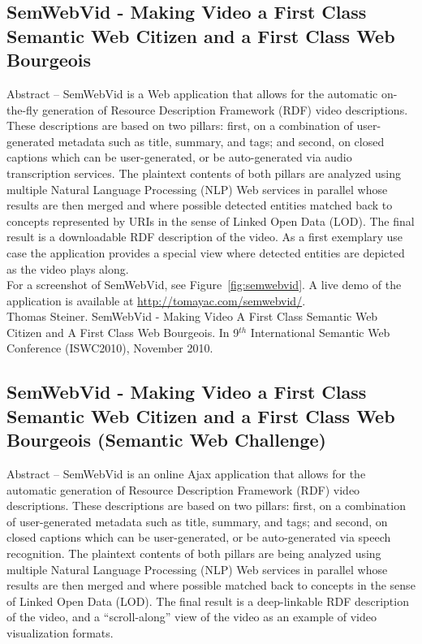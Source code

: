 \documentclass[12pt]{article}
\begin{document}
\subsection{SemWebVid - Making Video a First Class Semantic Web Citizen and a First Class Web Bourgeois}
Abstract -- SemWebVid is a Web application that allows for the automatic on-the-fly generation of Resource Description Framework (RDF) video descriptions. These descriptions are based on two pillars: first, on a combination of user-generated metadata such as title, summary, and tags; and second, on closed captions which can be user-generated, or be auto-generated via audio transcription services. The plaintext contents of both pillars are analyzed using multiple Natural Language Processing (NLP) Web services in parallel whose results are then merged and where possible detected entities matched back to concepts represented by URIs in the sense of Linked Open Data (LOD). The final result is a downloadable RDF description of the video. As a first exemplary use case the application provides a special view where detected entities are depicted as the video plays along.\\

\noindent For a screenshot of SemWebVid, see Figure~\ref{fig:semwebvid}. A live demo of the application is available at \url{http://tomayac.com/semwebvid/}.\\

\noindent Thomas Steiner. SemWebVid - Making Video A First Class Semantic Web Citizen and A First Class Web Bourgeois. In 9$^{th}$ International Semantic Web Conference (ISWC2010), November 2010.~\cite{semwebvid}

\subsection{SemWebVid - Making Video a First Class Semantic Web Citizen and a First Class Web Bourgeois (Semantic Web Challenge)}
Abstract -- SemWebVid  is an online Ajax application that allows for the automatic generation of Resource Description Framework (RDF) video descriptions. These descriptions are based on two pillars: first, on a combination of user-generated metadata such as title, summary, and tags; and second, on closed captions which can be user-generated, or be auto-generated via speech recognition. The plaintext contents of both pillars are being analyzed using multiple Natural Language Processing (NLP) Web services in parallel whose results are then merged and where possible matched back to concepts in the sense of Linked Open Data (LOD). The final result is a deep-linkable RDF description of the video, and a “scroll-along” view of the video as an example of video visualization formats.\\
\end{document}

